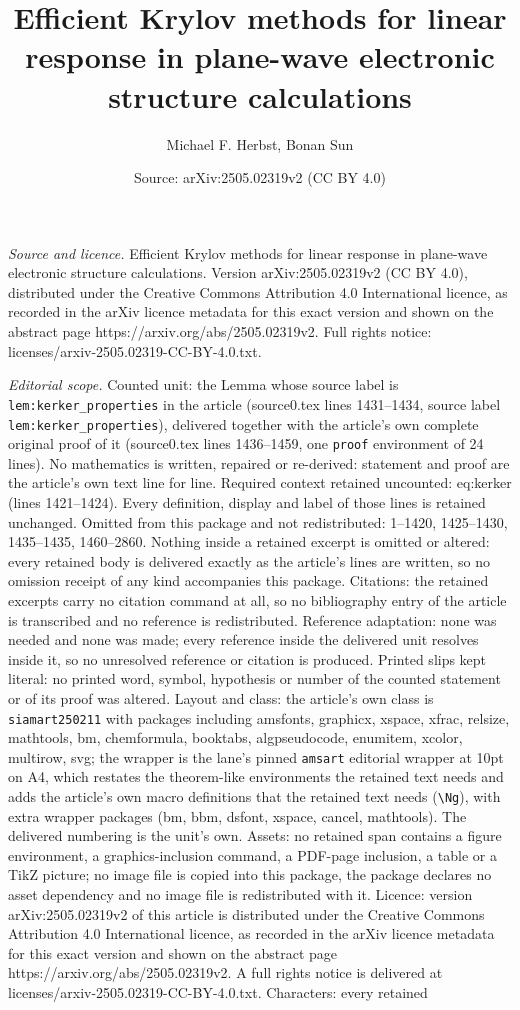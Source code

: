 \documentclass[10pt,a4paper]{amsart}
\title[Efficient Krylov methods for linear response in plane-wave e]{Efficient Krylov methods for linear response in plane-wave electronic structure calculations}
\author{Michael F. Herbst, Bonan Sun}
\date{Source: arXiv:2505.02319v2 (CC BY 4.0)}
\begin{document}
\maketitle

\noindent\emph{Source and licence.} Efficient Krylov methods for linear response in plane-wave electronic structure calculations. Version arXiv:2505.02319v2 (CC BY 4.0), distributed under the Creative Commons Attribution 4.0 International licence, as recorded in the arXiv licence metadata for this exact version and shown on the abstract page https://arxiv.org/abs/2505.02319v2. Full rights notice: licenses/arxiv-2505.02319-CC-BY-4.0.txt.\par\smallskip

\noindent\textit{Editorial scope.} Counted unit: the Lemma whose source label is \texttt{lem:kerker\_properties} in the article (source0.tex lines 1431--1434, source label \texttt{lem:kerker\_properties}), delivered together with the article's own complete original proof of it (source0.tex lines 1436--1459, one \texttt{proof} environment of 24 lines). No mathematics is written, repaired or re-derived: statement and proof are the article's own text line for line. Required context retained uncounted: eq:kerker (lines 1421--1424). Every definition, display and label of those lines is retained unchanged. Omitted from this package and not redistributed: 1--1420, 1425--1430, 1435--1435, 1460--2860. Nothing inside a retained excerpt is omitted or altered: every retained body is delivered exactly as the article's lines are written, so no omission receipt of any kind accompanies this package. Citations: the retained excerpts carry no citation command at all, so no bibliography entry of the article is transcribed and no reference is redistributed. Reference adaptation: none was needed and none was made; every reference inside the delivered unit resolves inside it, so no unresolved reference or citation is produced. Printed slips kept literal: no printed word, symbol, hypothesis or number of the counted statement or of its proof was altered. Layout and class: the article's own class is \texttt{siamart250211} with packages including amsfonts, graphicx, xspace, xfrac, relsize, mathtools, bm, chemformula, booktabs, algpseudocode, enumitem, xcolor, multirow, svg; the wrapper is the lane's pinned \texttt{amsart} editorial wrapper at 10pt on A4, which restates the theorem-like environments the retained text needs and adds the article's own macro definitions that the retained text needs (\texttt{\textbackslash Ng}), with extra wrapper packages (bm, bbm, dsfont, xspace, cancel, mathtools). The delivered numbering is the unit's own. Assets: no retained span contains a figure environment, a graphics-inclusion command, a PDF-page inclusion, a table or a TikZ picture; no image file is copied into this package, the package declares no asset dependency and no image file is redistributed with it. Licence: version arXiv:2505.02319v2 of this article is distributed under the Creative Commons Attribution 4.0 International licence, as recorded in the arXiv licence metadata for this exact version and shown on the abstract page https://arxiv.org/abs/2505.02319v2. A full rights notice is delivered at licenses/arxiv-2505.02319-CC-BY-4.0.txt. Characters: every retained 
\end{document}
